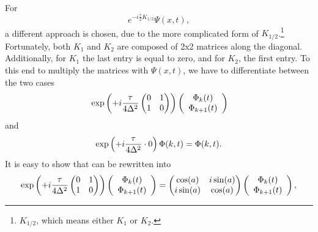 \noindent
For 
\begin{equation}
    e^{-i\frac{\tau}{2}{K_{1/2}}} \Psi(x,t),
\end{equation}
a different approach is chosen, due to the more complicated form of $K_{1/2}$.\footnote{$K_{1/2}$, which means either $K_1$ or $K_2$. } 
Fortunately, both $K_1$ and $K_2$ are composed of 2x2 matrices along the diagonal. Additionally, for $K_1$ the last entry is equal to zero, and for $K_2$, the first entry. To this end to multiply the matrices with $\Psi (x,t)$, we have to differentiate between the two cases
\begin{equation} 
\begin{split}
    &\exp \left(+ i{\tau\over 4\Delta^2 }
    \begin{pmatrix}
       0&1\\
       1&0\\
    \end{pmatrix}\right)
    \left(\begin{array}{c}
          \Phi _{k}(t)  \\
          \Phi _{k+1}(t)  \\
    \end{array}
    \right)\\ 
\end{split}
\end{equation}
and 
\begin{equation} \exp \left(+ i{\tau\over 4\Delta^2 }\cdot 0\right)
          \Phi(k,t) = \Phi(k,t).
          \label{eq: short}
\end{equation} 
It is easy to show that  can be rewritten into
\begin{equation} 
    \exp \left(+ i{\tau\over 4\Delta^2 }
    \begin{pmatrix}
       0&1\\
       1&0\\
    \end{pmatrix}\right)
    \left(\begin{array}{c}
          \Phi _k (t)  \\
          \Phi _{k+1}(t)  \\
    \end{array}
    \right)
={\begin{pmatrix}
       \cos(a)&i \sin(a)\\
       i \sin(a)& \cos(a)\\
    \end{pmatrix}} \left(\begin{array}{c}
          \Phi _{k}(t)  \\
          \Phi _{k+1}(t)  \\
    \end{array}
    \right),
    \label{eq: long}
\end{equation}
